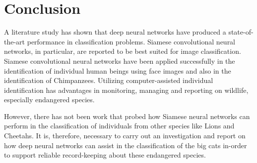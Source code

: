 %
%
%

\chapter{Conclusion}
A literature study has shown that deep neural networks have produced a state-of-the-art performance in classification problems. Siamese convolutional neural networks, in particular, are reported to be best suited for image classification. Siamese convolutional neural networks have been applied successfully in the identification of individual human beings using face images and also in the identification of Chimpanzees. Utilizing computer-assisted individual identification has advantages in monitoring, managing and reporting on wildlife, especially endangered species.

However, there has not been work that probed how Siamese neural networks can perform in the classification of individuals from other species like Lions and Cheetahs. It is, therefore, necessary to carry out an investigation and report on how deep neural networks can assist in the classification of the big cats in-order to support reliable record-keeping about these endangered species.